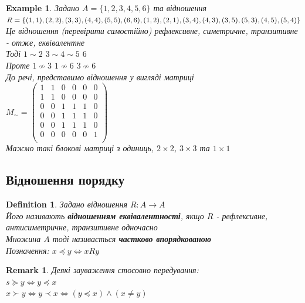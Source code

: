 \documentclass[a4paper, 14pt]{extarticle}
\theoremstyle{theoremdd}
\theoremstyle{theoremdd}
\newtheorem{definition}[theorem]{Definition}
\theoremstyle{theoremdd}
\theoremstyle{theoremdd}
\newtheorem{example}[theorem]{Example}
\theoremstyle{theoremdd}
\theoremstyle{theoremdd}
\newtheorem{remark}[theorem]{Remark}
\theoremstyle{theoremdd}
\theoremstyle{theoremdd}
\begin{document}
\begin{example}
Задано $A = \{1,2,3,4,5,6\}$ та відношення\\
$R = \{(1,1),(2,2),(3,3),(4,4),(5,5),(6,6),(1,2),(2,1),(3,4),(4,3),(3,5), \\ (5,3),(4,5),(5,4)\}$\\
Це відношення (перевірити самостійно) рефлексивне, симетричне, транзитивне - отже, еквівалентне\\
Тоді $1 \sim 2$ \hspace{0.5cm} $3 \sim 4 \sim 5$ \hspace{0.5cm} $6$\\
Проте $1 \not\sim 3$ \hspace{0.5cm} $1 \not\sim 6$ \hspace{0.5cm} $3 \not\sim 6$
\bigskip \\
До речі, представимо відношення у вигляді матриці\\
$M_{\sim} = \begin{pmatrix}
1 & 1 & 0 & 0 & 0 & 0 \\
1 & 1 & 0 & 0 & 0 & 0 \\
0 & 0 & 1 & 1 & 1 & 0 \\
0 & 0 & 1 & 1 & 1 & 0 \\
0 & 0 & 1 & 1 & 1 & 0 \\
0 & 0 & 0 & 0 & 0 & 1 \\
\end{pmatrix}$\\
Мажмо такі блокові матриці з одиниць, $2 \times 2$, $3 \times 3$ та $1 \times 1$
\end{example}

\subsection{Відношення порядку}
\begin{definition}
Задано відношення $R: A \to A$\\
Його називають \textbf{відношенням еквівалентності}, якщо $R$ - рефлексивне, антисиметричне, транзитивне одночасно\\
Множина $A$ тоді називається \textbf{частково впорядкованою}\\
Позначення: $x \preceq y \iff xRy$
\end{definition}

\begin{remark}
Деякі зауваження стосовно передування:\\
$s \succeq  y \iff y \preceq x$\\
$x \succ y \iff y \prec x \iff (y \preceq x) \wedge (x \neq y)$
\end{remark}
\end{document}

